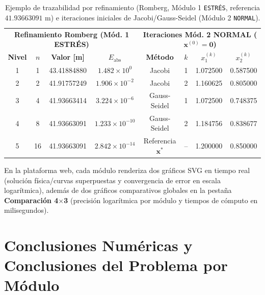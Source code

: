 \documentclass[11pt,a4paper]{article}
\begin{document}
\begin{table}[h!]
\centering
\small
\caption{Ejemplo de trazabilidad por refinamiento (Romberg, Módulo 1 \texttt{ESTRÉS}, referencia $41.93663091\text{ m}$) e iteraciones iniciales de Jacobi/Gauss-Seidel (Módulo 2 \texttt{NORMAL}).}
\begin{tabular}{cccc|cccc}
\toprule
\multicolumn{4}{c|}{\textbf{Refinamiento Romberg (Mód. 1 ESTRÉS)}} & \multicolumn{4}{c}{\textbf{Iteraciones Mód. 2 NORMAL ($\mathbf{x}^{(0)}=\mathbf{0}$)}} \\
\textbf{Nivel} & $n$ & \textbf{Valor [m]} & \textbf{$E_{\text{abs}}$} & \textbf{Método} & $k$ & $x_1^{(k)}$ & $x_2^{(k)}$ \\
\midrule
1 & 1 & 43.41884880 & $1.482\times 10^{0}$ & Jacobi & 1 & 1.072500 & 0.587500 \\
2 & 2 & 41.91757249 & $1.906\times 10^{-2}$ & Jacobi & 2 & 1.160625 & 0.805000 \\
3 & 4 & 41.93663414 & $3.224\times 10^{-6}$ & Gauss-Seidel & 1 & 1.072500 & 0.748375 \\
4 & 8 & 41.93663091 & $1.233\times 10^{-10}$ & Gauss-Seidel & 2 & 1.184756 & 0.838677 \\
5 & 16 & 41.93663091 & $2.842\times 10^{-14}$ & Referencia $\mathbf{x}^*$ & -- & 1.200000 & 0.850000 \\
\bottomrule
\end{tabular}
\end{table}

En la plataforma web, cada módulo renderiza dos gráficos SVG en tiempo real (solución física/curvas superpuestas y convergencia de error en escala logarítmica), además de dos gráficos comparativos globales en la pestaña \textbf{Comparación 4$\times$3} (precisión logarítmica por módulo y tiempos de cómputo en milisegundos).

\section{Conclusiones Numéricas y Conclusiones del Problema por Módulo}
\end{document}
